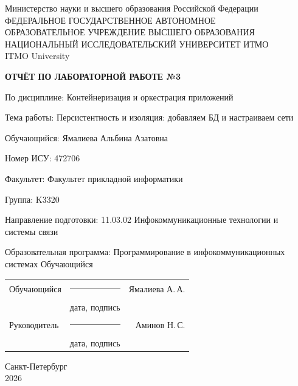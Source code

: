 \documentclass[14pt,a4paper,oneside]{extreport}
\newcommand{\LabNumber}{3}
\newcommand{\LabTitle}{Персистентность и изоляция: добавляем БД и настраиваем сети}
\newcommand{\CourseName}{Контейнеризация и оркестрация приложений}
\newcommand{\StudentName}{Ямалиева Альбина Азатовна}
\newcommand{\StudentShortName}{Ямалиева А.\,А.}
\newcommand{\StudentISU}{472706}
\newcommand{\StudentGroup}{K3320}
\newcommand{\FacultyName}{Факультет прикладной информатики}
\newcommand{\DegreeProgramme}{11.03.02 Инфокоммуникационные технологии и системы связи}
\newcommand{\EducationProgramme}{Программирование в инфокоммуникационных системах
Обучающийся}
\newcommand{\TeacherName}{Аминов Н.\,С.}
\newcommand{\ReportCity}{Санкт-Петербург}
\newcommand{\ReportYear}{2026}
\begin{document}
\begin{titlepage}
  \thispagestyle{empty}
  \begin{center}
    \fontsize{12pt}{16pt}\selectfont
    Министерство науки и высшего образования Российской Федерации\\[0.25\baselineskip]
    ФЕДЕРАЛЬНОЕ ГОСУДАРСТВЕННОЕ АВТОНОМНОЕ\\
    ОБРАЗОВАТЕЛЬНОЕ УЧРЕЖДЕНИЕ ВЫСШЕГО ОБРАЗОВАНИЯ\\[0.25\baselineskip]
    НАЦИОНАЛЬНЫЙ ИССЛЕДОВАТЕЛЬСКИЙ УНИВЕРСИТЕТ ИТМО\\
    ITMO University
  \end{center}
  \vspace{0.8\baselineskip}
  \begin{center}
    \textbf{ОТЧЁТ ПО ЛАБОРАТОРНОЙ РАБОТЕ №\LabNumber}
  \end{center}
  \vspace{0.4\baselineskip}
  \begingroup
  \setlength{\parindent}{0pt}
  По дисциплине: \CourseName\par\medskip
  Тема работы: \LabTitle\par\medskip
  Обучающийся: \StudentName\par\medskip
  Номер ИСУ: \StudentISU\par\medskip
  Факультет: \FacultyName\par\medskip
  Группа: \StudentGroup\par\medskip
  Направление подготовки: \DegreeProgramme\par\medskip
  Образовательная программа: \EducationProgramme\par
  \endgroup
  \vfill
  \begin{tabularx}{\textwidth}{@{}l>{\centering\arraybackslash}Xr@{}}
    Обучающийся & \rule{25mm}{0.4pt} & \StudentShortName\\
    & {\fontsize{12pt}{14pt}\selectfont дата, подпись} &\\[0.4\baselineskip]
    Руководитель & \rule{25mm}{0.4pt} & \TeacherName\\
    & {\fontsize{12pt}{14pt}\selectfont дата, подпись} &
  \end{tabularx}
  \vfill
  \begin{center}
    \ReportCity\\
    \ReportYear
  \end{center}
\end{titlepage}
\setcounter{page}{2}
\tableofcontents

\end{document}
